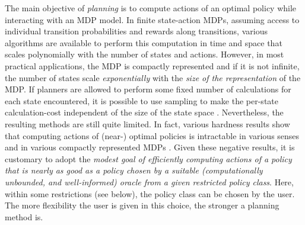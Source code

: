 \documentclass[twocolumn]{IEEEtran}
\begin{document}
The main objective of \emph{planning} is to compute actions of an optimal policy while interacting with an MDP model.
In finite state-action MDPs,
assuming access to individual transition probabilities and rewards along transitions,
various algorithms are available to perform this computation in time and space that scales polynomially with the number of states and actions.
However, in most practical applications, the MDP is compactly represented
and if it is not infinite, the number of states scale \emph{exponentially} with the \emph{size of the representation} of the MDP.
If planners are allowed to perform some fixed number of calculations for each state encountered,
it is possible to use sampling to make the per-state calculation-cost
independent of the size of the state space \cite{rust96:randomization,szepesvari2001,kearns2002sparse}.
Nevertheless, the resulting methods are still quite limited.
In fact, various hardness results show that computing actions of (near-) optimal policies is intractable in various senses
and in various compactly represented MDPs \cite{BlonTsi:00Complexity}.
Given these negative results,
it is customary to adopt the \emph{modest goal of efficiently computing actions of a policy that
is nearly as good as a policy chosen by a suitable (computationally unbounded, and well-informed) oracle
from a given restricted policy class}. 
Here, within some restrictions (see below), the policy class can be chosen by the user.
The more flexibility the user is given in this choice, the stronger a planning method is.  %
\end{document}
